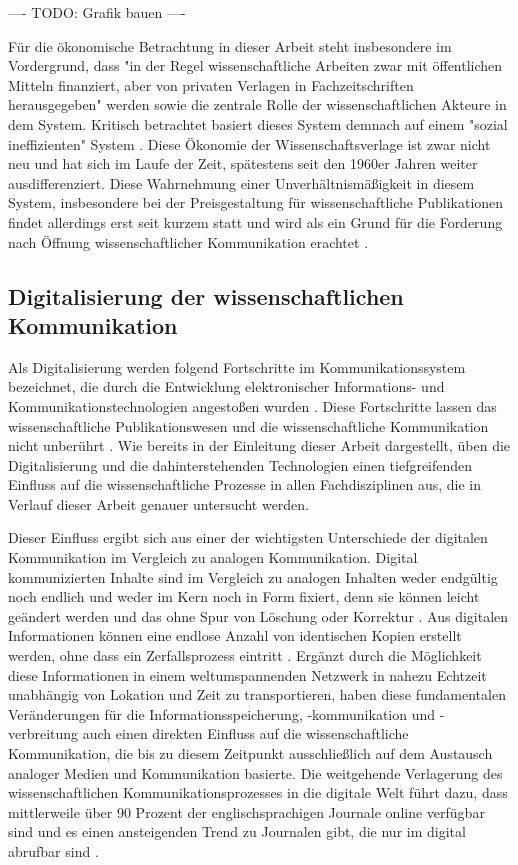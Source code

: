 ---- TODO: Grafik bauen ----

Für die ökonomische Betrachtung in dieser Arbeit steht insbesondere im Vordergrund, dass "in der Regel wissenschaftliche Arbeiten zwar mit öffentlichen Mitteln finanziert, aber von privaten Verlagen in Fachzeitschriften herausgegeben" werden \cite[:9]{WD_bundestag_2009} \cite[:2]{Reichert_2009} sowie die zentrale Rolle der wissenschaftlichen Akteure in dem System. Kritisch betrachtet basiert dieses System demnach auf einem "sozial ineffizienten" System \cite[:47]{mueller-langer_2010}. Diese Ökonomie der Wissenschaftsverlage ist zwar nicht neu und hat sich im Laufe der Zeit, spätestens seit den 1960er Jahren weiter ausdifferenziert. Diese Wahrnehmung einer Unverhältnismäßigkeit in diesem System, insbesondere bei der Preisgestaltung für wissenschaftliche Publikationen \cite{King_2008} findet allerdings erst seit kurzem statt \cite{CREATe_2014} und wird als ein Grund für die Forderung nach Öffnung wissenschaftlicher Kommunikation erachtet \cite{yiotis_2013_open} \cite{herb_2010}.

\subsection{Digitalisierung der wissenschaftlichen Kommunikation}

Als Digitalisierung werden folgend Fortschritte im Kommunikationssystem bezeichnet, die durch die Entwicklung elektronischer Informations- und Kommunikationstechnologien angestoßen wurden \cite{bbaw_publizieren_2015}. Diese Fortschritte lassen das wissenschaftliche Publikationswesen und die wissenschaftliche Kommunikation nicht unberührt \cite{naeder_2010_open}. Wie bereits in der Einleitung dieser Arbeit dargestellt, üben die Digitalisierung und die dahinterstehenden Technologien einen tiefgreifenden Einfluss auf die wissenschaftliche Prozesse in allen Fachdisziplinen aus, die in Verlauf dieser Arbeit genauer untersucht werden.

Dieser Einfluss ergibt sich aus einer der wichtigsten Unterschiede der digitalen Kommunikation im Vergleich zu analogen Kommunikation. Digital kommunizierten Inhalte sind im Vergleich zu analogen Inhalten weder endgültig noch endlich und weder im Kern noch in Form fixiert, denn sie können leicht geändert werden und das ohne Spur von Löschung oder Korrektur \cite{smith_1999_digitize}. Aus digitalen Informationen können eine endlose Anzahl von identischen Kopien erstellt werden, ohne dass ein Zerfallsprozess eintritt \cite{smith_1999_digitize}. Ergänzt durch die Möglichkeit diese Informationen in einem weltumspannenden Netzwerk in nahezu Echtzeit unabhängig von Lokation und Zeit zu transportieren, haben diese fundamentalen Veränderungen für die Informationsspeicherung, -kommunikation und -verbreitung auch einen direkten Einfluss auf die wissenschaftliche Kommunikation, die bis zu diesem Zeitpunkt ausschließlich auf dem Austausch analoger Medien und Kommunikation basierte. Die weitgehende Verlagerung des wissenschaftlichen Kommunikationsprozesses in die digitale Welt führt dazu, dass mittlerweile über 90 Prozent der englischsprachigen Journale online verfügbar sind und es einen ansteigenden Trend zu Journalen gibt, die nur im digital abrufbar sind \cite{cope2014future} \cite{cite:5}.

